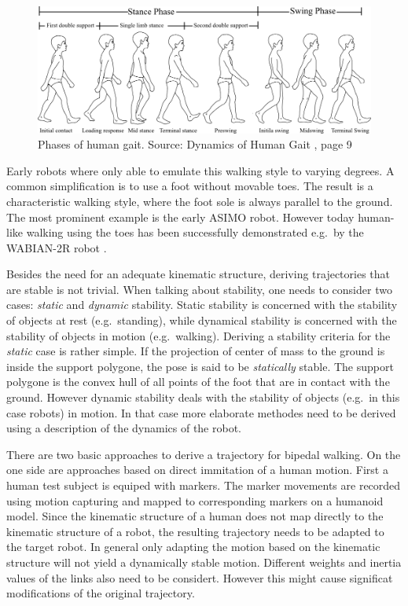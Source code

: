 \documentclass[english,ngerman]{KITreprt}
\newcommand{\name}[1]{\textsc{#1}}
\begin{document}
\begin{figure}[tb]
\vspace*{-1em}
\includegraphics[width=\textwidth]{images/human_gait.png}
\caption{Phases of human gait. Source: Dynamics of Human Gait \cite{vaughan1992dynamics}, page 9}
\label{img:human-gait}
\end{figure}

Early robots where only able to emulate this walking style to varying
degrees. A common simplification is to use a foot without movable toes.
The result is a characteristic walking style, where the foot sole is
always parallel to the ground. The most prominent example is the early
\name{ASIMO} robot. However today human-like walking using the toes has
been successfully demonstrated e.g.~by the \name{WABIAN-2R} robot
\cite{ogura2006human}.

Besides the need for an adequate kinematic structure, deriving
trajectories that are stable is not trivial. When talking about
stability, one needs to consider two cases: \emph{static} and
\emph{dynamic} stability. Static stability is concerned with the
stability of objects at rest (e.g.~standing), while dynamical stability
is concerned with the stability of objects in motion (e.g.~walking).
Deriving a stability criteria for the \emph{static} case is rather
simple. If the projection of center of mass to the ground is inside the
support polygone, the pose is said to be \emph{statically} stable. The
support polygone is the convex hull of all points of the foot that are
in contact with the ground. However dynamic stability deals with the
stability of objects (e.g.~in this case robots) in motion. In that case
more elaborate methodes need to be derived using a description of the
dynamics of the robot.

There are two basic approaches to derive a trajectory for bipedal
walking. On the one side are approaches based on direct immitation of a
human motion. First a human test subject is equiped with markers. The
marker movements are recorded using motion capturing and mapped to
corresponding markers on a humanoid model. Since the kinematic structure
of a human does not map directly to the kinematic structure of a robot,
the resulting trajectory needs to be adapted to the target robot. In
general only adapting the motion based on the kinematic structure will
not yield a dynamically stable motion. Different weights and inertia
values of the links also need to be considert. However this might cause
significat modifications of the original trajectory.
\end{document}
